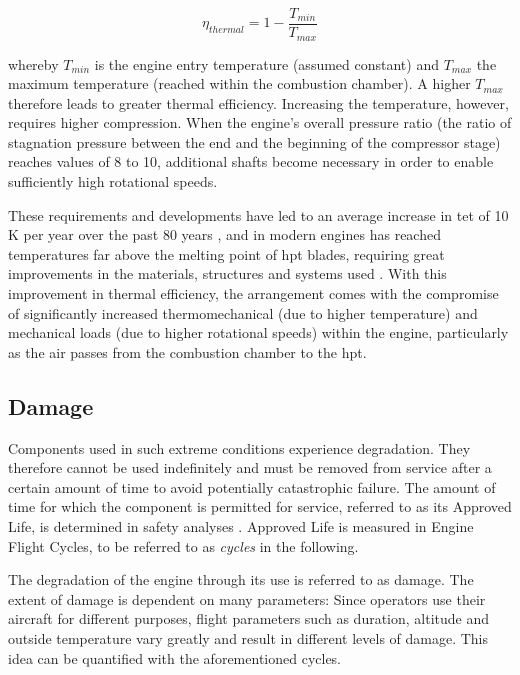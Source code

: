 \[
    \eta_{thermal} = 1 - \frac{T_{min}}{T_{max}}
\]

whereby \(T_{min}\) is the engine entry temperature (assumed constant) and \(T_{max}\) the maximum temperature (reached within the combustion chamber). A higher \(T_{max}\) therefore leads to greater thermal efficiency. Increasing the temperature, however, requires %
higher compression. When the engine's overall pressure ratio (the ratio of stagnation pressure between the end and the beginning of the compressor stage) reaches values of 8 to 10, additional shafts become necessary \cite[p. 58]{braunling_flugzeugtriebwerke_2015} in order to enable sufficiently high rotational speeds.

These requirements and developments have led to an average increase in \ac{tet} of 10 K per year over the past 80 years \cite[]{kyprianidis_future_2011}, and in modern engines has reached temperatures far above the melting point of \ac{hpt} blades, requiring great improvements in the materials, structures and systems used \cite[]{spittle_gas_2003}. With this improvement in thermal efficiency, the arrangement comes with the compromise of significantly increased thermomechanical (due to higher temperature) and mechanical loads (due to higher rotational speeds) within the engine, particularly as the air passes from the combustion chamber to the \ac{hpt}.

\subsection{Damage}\label{damage}
Components used in such extreme conditions experience degradation. They therefore cannot be used indefinitely and must be removed from service after a certain amount of time to avoid potentially catastrophic failure. The amount of time for which the component is permitted for service, referred to as its Approved Life, is determined in safety analyses \cite[]{easa_certification_2015}. Approved Life is measured in Engine Flight Cycles, to be referred to as \textit{cycles} in the following.

The degradation of the engine through its use is referred to as damage. The extent of damage is dependent on many parameters: Since operators use their aircraft for different purposes, flight parameters such as duration, altitude and outside temperature vary greatly and result in different levels of damage. This idea can be quantified with the aforementioned cycles.

